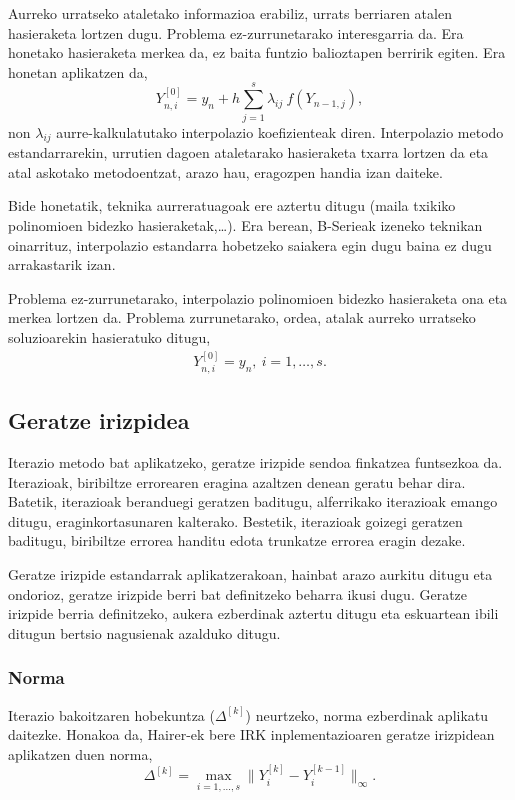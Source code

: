 \begin{enumerate}
Aurreko urratseko ataletako informazioa erabiliz, urrats berriaren atalen hasieraketa lortzen dugu. Problema ez-zurrunetarako interesgarria da. Era honetako hasieraketa merkea da, ez baita funtzio balioztapen berririk egiten. Era honetan aplikatzen da,
\begin{equation*}
Y_{n,i}^{[0]}=y_n+h \sum_{j=1}^{s} \lambda_{ij} \ f(Y_{n-1,j}),
\end{equation*}
non $\lambda_{ij}$ aurre-kalkulatutako interpolazio koefizienteak diren. Interpolazio metodo estandarrarekin, urrutien dagoen ataletarako hasieraketa txarra lortzen da eta atal askotako metodoentzat, arazo hau, eragozpen handia izan daiteke. 


Bide honetatik, teknika aurreratuagoak ere aztertu ditugu (maila txikiko polinomioen bidezko hasieraketak,\dots). Era berean, B-Serieak izeneko teknikan \cite{Chartier2010} oinarrituz, interpolazio estandarra \cite{Laburta1998} hobetzeko saiakera egin dugu baina ez dugu arrakastarik izan.  

\end{enumerate}

Problema ez-zurrunetarako, interpolazio polinomioen bidezko hasieraketa ona eta merkea lortzen da. Problema zurrunetarako, ordea, atalak aurreko urratseko soluzioarekin hasieratuko ditugu,
\begin{align*}
Y_{n,i}^{[0]}=y_n, \ i=1,\dots,s.  
\end{align*}
    

\subsection*{Geratze irizpidea}

Iterazio metodo bat aplikatzeko, geratze irizpide sendoa finkatzea funtsezkoa da.  Iterazioak, biribiltze errorearen eragina azaltzen denean geratu behar dira. Batetik, iterazioak beranduegi geratzen baditugu, alferrikako iterazioak emango ditugu, eraginkortasunaren kalterako. Bestetik, iterazioak goizegi geratzen baditugu, biribiltze errorea handitu edota trunkatze errorea eragin dezake.  

Geratze irizpide estandarrak aplikatzerakoan, hainbat arazo aurkitu ditugu eta ondorioz, geratze irizpide berri bat definitzeko beharra ikusi dugu. Geratze irizpide berria definitzeko, aukera ezberdinak aztertu ditugu eta eskuartean ibili ditugun bertsio nagusienak azalduko ditugu.      

\subsubsection*{Norma}
Iterazio bakoitzaren hobekuntza ($\Delta^{[k]}$) neurtzeko, norma ezberdinak aplikatu daitezke. Honakoa da,  Hairer-ek bere IRK inplementazioaren geratze irizpidean aplikatzen duen norma,
\begin{equation*}
\Delta^{[k]}= \max_{i=1,\dots,s} \|Y_i^{[k]}-Y_i^{[k-1]}\|_{\infty}.
\end{equation*}

